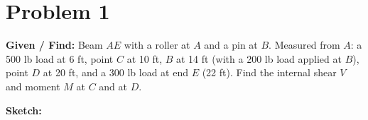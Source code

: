 \documentclass[11pt]{article}
\begin{document}

\clearpage
\section*{Problem 1}

\textbf{Given / Find:} Beam $AE$ with a roller at $A$ and a pin at $B$. Measured from $A$: a 500 lb load at 6 ft, point $C$ at 10 ft, $B$ at 14 ft (with a 200 lb load applied at $B$), point $D$ at 20 ft, and a 300 lb load at end $E$ (22 ft). Find the internal shear $V$ and moment $M$ at $C$ and at $D$.

\textbf{Sketch:}
\end{document}

